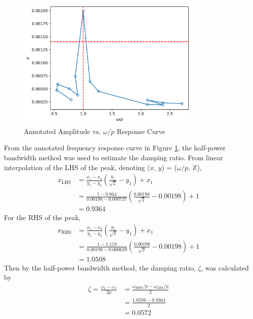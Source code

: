 \begin{figure}[h]
    \centering
    \includegraphics[width=0.8\textwidth]{Questions/Plots/X_vs_omega_p_with_lines.png}
    \caption{Annotated Amplitude vs. $\omega/p$ Response Curve}
    \label{fig:frequency_response_curve_with_lines}
\end{figure}
From the annotated frequency response curve in Figure \ref{fig:frequency_response_curve_with_lines}, the half-power bandwidth method was used to estimate the damping ratio. From linear interpolation of the LHS of the peak, denoting ($x$, $y$) = ($\omega/p$, $\mathbb{X}$), 
\begin{align*}
    x_{\text{LHS}} &= \frac{x_1 - x_2}{y_1 - y_2} \left(\frac{y_1}{\sqrt{2}} - y_1\right) + x_1 \\
    &= \frac{1 - 0.864}{0.00198 - 0.000737} \left(\frac{0.00198}{\sqrt{2}} - 0.00198\right) + 1 \\
    &= 0.9364 
\end{align*}
For the RHS of the peak,
\begin{align*}
    x_{\text{RHS}} &= \frac{x_1 - x_2}{y_1 - y_2} \left(\frac{y_1}{\sqrt{2}} - y_1\right) + x_1 \\
    &= \frac{1 - 1.118}{0.00198 - 0.000639} \left(\frac{0.00198}{\sqrt{2}} - 0.00198\right) + 1 \\
    &= 1.0508
\end{align*}
Then by the half-power bandwidth method, the damping ratio, $\zeta$, was calculated by
\begin{align*}
    \zeta = \frac{\omega_2 - \omega_1}{2p} &= \frac{\omega_{\text{RHS}}/p - \omega_{\text{LHS}}/p}{2} \\
    &= \frac{1.0508 - 0.9364}{2} \\
    &= \boxed{0.0572}
\end{align*}

